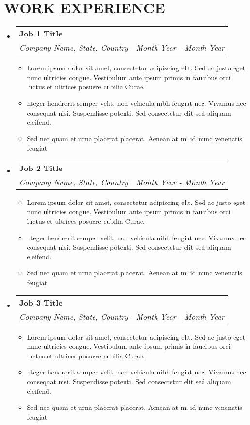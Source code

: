 \documentclass[letterpaper,11pt]{article}
\makeatletter
\newcommand{\resumeItem}[1]{
  \item\small{
    {#1 \vspace{-1pt}}
  }
}
\newcommand{\resumeSubheading}[4]{
  \vspace{-2pt}\item
    \begin{tabular*}{1.0\textwidth}[t]{l@{\extracolsep{\fill}}r}
      \textbf{\large#1} & \textbf{\small #2} \\
      \textit{\large#3} & \textit{\small #4} \\
      
    \end{tabular*}\vspace{-7pt}
}
\newcommand{\resumeSubHeadingListStart}{\begin{itemize}[leftmargin=0.0in, label={}]}
\newcommand{\resumeSubHeadingListEnd}{\end{itemize}}
\newcommand{\resumeItemListStart}{\begin{itemize}[leftmargin=0.1in]}
\newcommand{\resumeItemListEnd}{\end{itemize}\vspace{-5pt}}
\makeatother
\begin{document}
\section{\color{airforceblue}WORK EXPERIENCE}
  \resumeSubHeadingListStart

    \resumeSubheading
      {Job 1 Title}{} 
      {Company Name, State, Country}{Month Year - Month Year}
      \resumeItemListStart
            \resumeItem{\normalsize{Lorem ipsum dolor sit amet, consectetur adipiscing elit. Sed ac justo eget nunc ultricies congue. Vestibulum ante ipsum primis in faucibus orci luctus et ultrices posuere cubilia Curae.}}
            \resumeItem{\normalsize{nteger hendrerit semper velit, non vehicula nibh feugiat nec. Vivamus nec consequat nisi. Suspendisse potenti. Sed consectetur elit sed aliquam eleifend.}}  
            \resumeItem{\normalsize{Sed nec quam et urna placerat placerat. Aenean at mi id nunc venenatis feugiat}}  
      \resumeItemListEnd  

    \resumeSubheading
      {Job 2 Title}{} 
      {Company Name, State, Country}{Month Year - Month Year}
      \resumeItemListStart
            \resumeItem{\normalsize{Lorem ipsum dolor sit amet, consectetur adipiscing elit. Sed ac justo eget nunc ultricies congue. Vestibulum ante ipsum primis in faucibus orci luctus et ultrices posuere cubilia Curae.}}
            \resumeItem{\normalsize{nteger hendrerit semper velit, non vehicula nibh feugiat nec. Vivamus nec consequat nisi. Suspendisse potenti. Sed consectetur elit sed aliquam eleifend.}}  
            \resumeItem{\normalsize{Sed nec quam et urna placerat placerat. Aenean at mi id nunc venenatis feugiat}}  
      \resumeItemListEnd  

    \resumeSubheading
      {Job 3 Title}{} 
      {Company Name, State, Country}{Month Year - Month Year}
      \resumeItemListStart
            \resumeItem{\normalsize{Lorem ipsum dolor sit amet, consectetur adipiscing elit. Sed ac justo eget nunc ultricies congue. Vestibulum ante ipsum primis in faucibus orci luctus et ultrices posuere cubilia Curae.}}
            \resumeItem{\normalsize{nteger hendrerit semper velit, non vehicula nibh feugiat nec. Vivamus nec consequat nisi. Suspendisse potenti. Sed consectetur elit sed aliquam eleifend.}}  
            \resumeItem{\normalsize{Sed nec quam et urna placerat placerat. Aenean at mi id nunc venenatis feugiat}}  
      \resumeItemListEnd  

  \resumeSubHeadingListEnd
\vspace{-12pt}
\end{document}
